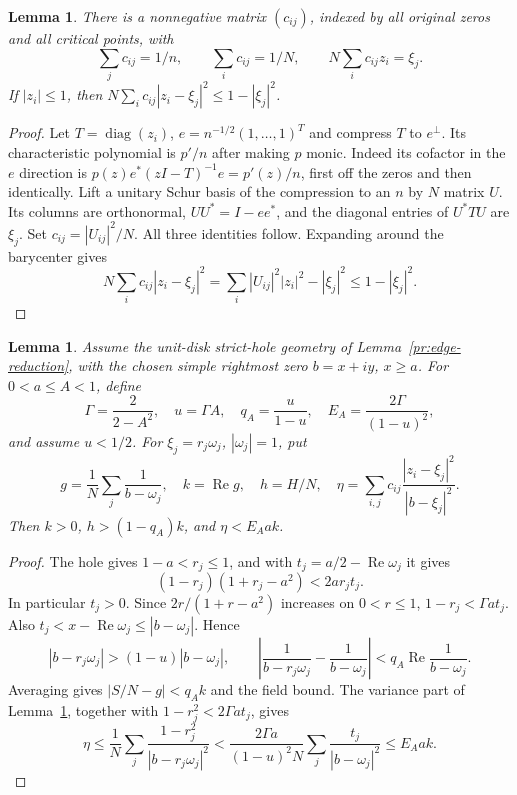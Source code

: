 \documentclass[11pt,reqno]{amsart}
\numberwithin{equation}{section}
\newtheorem{lemma}[theorem]{Lemma}
\theoremstyle{definition}
\theoremstyle{remark}
\DeclareMathOperator{\diag}{diag}
\renewcommand{\Re}{\operatorname{Re}}
\begin{document}
\begin{lemma}\label{lt:schur}
There is a nonnegative matrix $(c_{ij})$, indexed by all original
zeros and all critical points, with
\[
 \sum_jc_{ij}=1/n,\qquad \sum_ic_{ij}=1/N,\qquad
 N\sum_ic_{ij}z_i=\xi_j.
\]
If $|z_i|\le1$, then
$N\sum_ic_{ij}|z_i-\xi_j|^2\le1-|\xi_j|^2$.
\end{lemma}
\begin{proof}
Let $T=\diag(z_i)$, $e=n^{-1/2}(1,\ldots,1)^T$ and compress
$T$ to $e^\perp$. Its characteristic polynomial is $p'/n$ after
making $p$ monic. Indeed its cofactor in the $e$ direction is
$p(z)e^*(zI-T)^{-1}e=p'(z)/n$, first off the zeros and then
identically. Lift a unitary Schur basis of the compression to an
$n$ by $N$ matrix $U$. Its columns are orthonormal,
$UU^*=I-ee^*$, and the diagonal entries of $U^*TU$ are
$\xi_j$. Set $c_{ij}=|U_{ij}|^2/N$. All three identities follow.
Expanding around the barycenter gives
\[
 N\sum_ic_{ij}|z_i-\xi_j|^2
  =\sum_i|U_{ij}|^2|z_i|^2-|\xi_j|^2\le1-|\xi_j|^2.
\]
\end{proof}

\begin{lemma}\label{lt:transport}
Assume the unit-disk strict-hole geometry of
Lemma~\ref{pr:edge-reduction}, with the chosen simple rightmost zero
$b=x+iy$, $x\ge a$. For $0<a\le A<1$, define
\[
 \Gamma=\frac2{2-A^2},\quad u=\Gamma A,\quad
 q_A=\frac{u}{1-u},\quad E_A=\frac{2\Gamma}{(1-u)^2},
\]
and assume $u<1/2$. For $\xi_j=r_j\omega_j$, $|\omega_j|=1$, put
\[
 g=\frac1N\sum_j\frac1{b-\omega_j},\quad k=\Re g,\quad h=H/N,
 \quad \eta=\sum_{i,j}c_{ij}\frac{|z_i-\xi_j|^2}{|b-\xi_j|^2}.
\]
Then $k>0$, $h>(1-q_A)k$, and $\eta<E_Aak$.
\end{lemma}
\begin{proof}
The hole gives $1-a<r_j\le1$, and with
$t_j=a/2-\Re\omega_j$ it gives
\[
 (1-r_j)(1+r_j-a^2)<2ar_jt_j.
\]
In particular $t_j>0$. Since $2r/(1+r-a^2)$ increases on
$0<r\le1$, $1-r_j<\Gamma at_j$. Also
$t_j<x-\Re\omega_j\le|b-\omega_j|$. Hence
\[
 |b-r_j\omega_j|>(1-u)|b-\omega_j|,\qquad
 \left|\frac1{b-r_j\omega_j}-\frac1{b-\omega_j}\right|
 <q_A\Re\frac1{b-\omega_j}.
\]
Averaging gives $|S/N-g|<q_Ak$ and the field bound. The variance
part of Lemma~\ref{lt:schur}, together with
$1-r_j^2<2\Gamma at_j$, gives
\[
 \eta\le\frac1N\sum_j\frac{1-r_j^2}{|b-r_j\omega_j|^2}
 <\frac{2\Gamma a}{(1-u)^2N}
       \sum_j\frac{t_j}{|b-\omega_j|^2}\le E_Aak.
\]
\end{proof}
\end{document}
